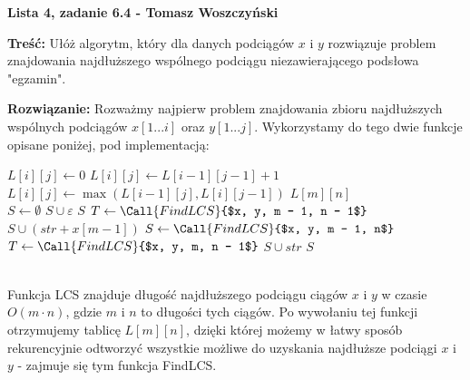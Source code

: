 \documentclass[a4paper,12pt]{article}
\begin{document}
\noindent \textbf{Lista 4, zadanie 6.4 - Tomasz Woszczyński}\newline

\noindent \newline \textbf{Treść:} Ułóż algorytm, który dla danych podciągów $x$ i $y$ rozwiązuje problem znajdowania najdłuższego wspólnego podciągu niezawierającego podsłowa "egzamin". \newline

\noindent \textbf{Rozwiązanie:} Rozważmy najpierw problem znajdowania zbioru najdłuższych wspólnych podciągów $x[1...i]$ oraz $y[1...j]$. Wykorzystamy do tego dwie funkcje opisane poniżej, pod implementacją:\newline
\begin{algorithmic}
				\State $L[i][j] \gets 0$
				\State $L[i][j] \gets L[i-1][j-1]+1$
			\Else
				\State $L[i][j] \gets \max(L[i-1][j], L[i][j-1])$
			\EndIf 
		\EndFor
	\EndFor
	\State \Return $L[m][n]$
\EndFunction
~\\
	\State $S \gets \emptyset$ 
	 
		\State $S \cup \varepsilon$
		\State \Return $S$
	\EndIf
	 
		\State $T \gets \Call{FindLCS}{$x, y, m - 1, n - 1$}$ 
		 
			\State $S \cup (str + x[m-1])$
		\EndFor
	\Else {}
			\State $S \gets \Call{FindLCS}{$x, y, m - 1, n$}$
		\EndIf
			\State $T \gets \Call{FindLCS}{$x, y, m, n - 1$}$
			 
				\State $S \cup str$ 
			\EndFor
		\EndIf
	\EndIf
	\State \Return $S$ 
\EndFunction
\end{algorithmic}

~\\ \noindent Funkcja LCS znajduje długość najdłuższego podciągu ciągów $x$ i $y$  w czasie $O(m\cdot n)$, gdzie $m$ i $n$ to długości tych ciągów. Po wywołaniu tej funkcji otrzymujemy tablicę $L[m][n]$, dzięki której możemy w łatwy sposób rekurencyjnie odtworzyć wszystkie możliwe do uzyskania najdłuższe podciągi $x$ i $y$ - zajmuje się tym funkcja FindLCS.
\end{document}
